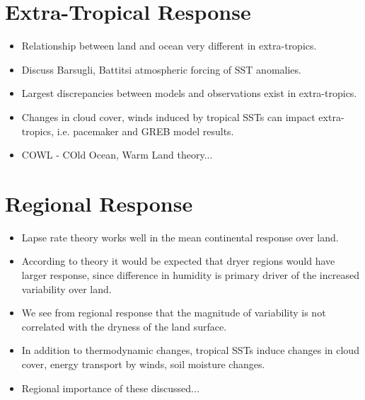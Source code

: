 \section{Extra-Tropical Response}
\begin{itemize}
	\item Relationship between land and ocean very different in extra-tropics.
	\item Discuss Barsugli, Battitsi atmospheric forcing of SST anomalies.
	\item Largest discrepancies between models and observations exist in 
		extra-tropics.
	\item Changes in cloud cover, winds induced by tropical SSTs can impact 
		extra-tropics, i.e. pacemaker and GREB model results.
	\item COWL - COld Ocean, Warm Land theory...
\end{itemize}


\section{Regional Response}

\begin{itemize}
	\item Lapse rate theory works well in the mean continental response over 
		land.
	\item According to theory it would be expected that dryer regions would have 
		larger response, since difference in humidity is primary driver of the 
		increased variability over land.
	\item We see from regional response that the magnitude of variability is not 
		correlated with the dryness of the land surface.
	\item In addition to thermodynamic changes, tropical SSTs induce changes in 
		cloud cover, energy transport by winds, soil moisture changes.
	\item Regional importance of these discussed...
\end{itemize}